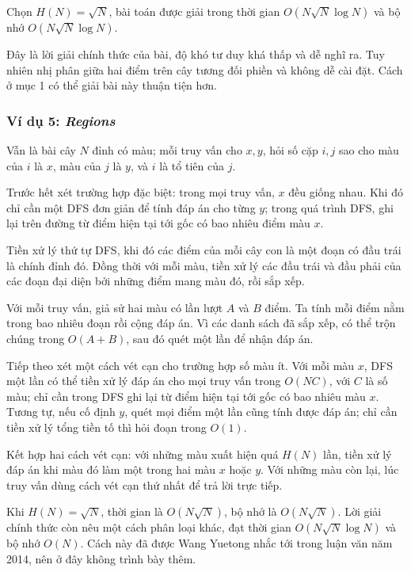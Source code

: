\documentclass[11pt]{article}
\begin{document}
Chọn \(H(N)=\sqrt N\), bài toán được giải trong thời gian
\(O(N\sqrt N\log N)\) và bộ nhớ \(O(N\sqrt N\log N)\).

Đây là lời giải chính thức của bài, độ khó tư duy khá thấp và dễ nghĩ ra. Tuy
nhiên nhị phân giữa hai điểm trên cây tương đối phiền và không dễ cài đặt. Cách
ở mục 1 có thể giải bài này thuận tiện hơn.

\subsubsection{\texorpdfstring{Ví dụ 5: \emph{Regions}}{Ví dụ 5: Regions}}

Vẫn là bài cây \(N\) đỉnh có màu; mỗi truy vấn cho \(x,y\), hỏi số cặp
\(i,j\) sao cho màu của \(i\) là \(x\), màu của \(j\) là \(y\), và \(i\) là tổ
tiên của \(j\).

Trước hết xét trường hợp đặc biệt: trong mọi truy vấn, \(x\) đều giống nhau.
Khi đó chỉ cần một DFS đơn giản để tính đáp án cho từng \(y\); trong quá trình
DFS, ghi lại trên đường từ điểm hiện tại tới gốc có bao nhiêu điểm màu \(x\).

Tiền xử lý thứ tự DFS, khi đó các điểm của mỗi cây con là một đoạn có đầu trái
là chính đỉnh đó. Đồng thời với mỗi màu, tiền xử lý các đầu trái và đầu phải
của các đoạn đại diện bởi những điểm mang màu đó, rồi sắp xếp.

Với mỗi truy vấn, giả sử hai màu có lần lượt \(A\) và \(B\) điểm. Ta tính mỗi
điểm nằm trong bao nhiêu đoạn rồi cộng đáp án. Vì các danh sách đã sắp xếp, có
thể trộn chúng trong \(O(A+B)\), sau đó quét một lần để nhận đáp án.

Tiếp theo xét một cách vét cạn cho trường hợp số màu ít. Với mỗi màu \(x\), DFS
một lần có thể tiền xử lý đáp án cho mọi truy vấn trong \(O(NC)\), với \(C\) là
số màu; chỉ cần trong DFS ghi lại từ điểm hiện tại tới gốc có bao nhiêu màu
\(x\). Tương tự, nếu cố định \(y\), quét mọi điểm một lần cũng tính được đáp
án; chỉ cần tiền xử lý tổng tiền tố thì hỏi đoạn trong \(O(1)\).

Kết hợp hai cách vét cạn: với những màu xuất hiện quá \(H(N)\) lần, tiền xử lý
đáp án khi màu đó làm một trong hai màu \(x\) hoặc \(y\). Với những màu còn lại,
lúc truy vấn dùng cách vét cạn thứ nhất để trả lời trực tiếp.

Khi \(H(N)=\sqrt N\), thời gian là \(O(N\sqrt N)\), bộ nhớ là \(O(N\sqrt N)\).
Lời giải chính thức còn nêu một cách phân loại khác, đạt thời gian
\(O(N\sqrt N\log N)\) và bộ nhớ \(O(N)\). Cách này đã được Wang Yuetong nhắc
tới trong luận văn năm 2014, nên ở đây không trình bày thêm.
\end{document}
